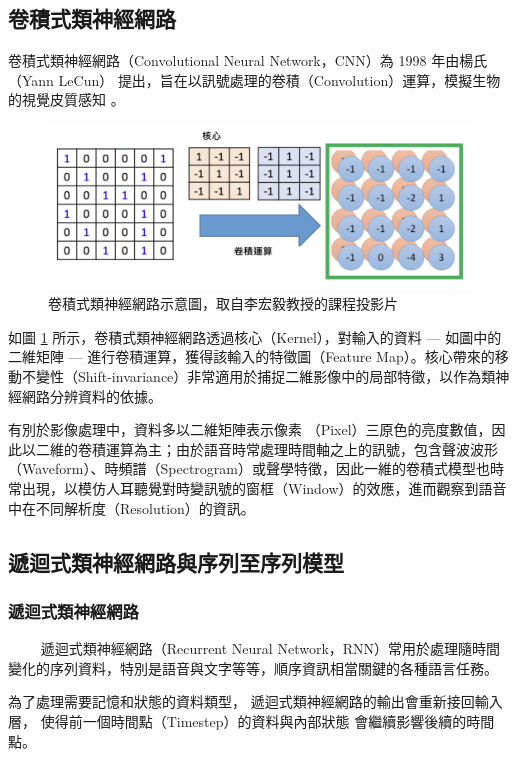 \subsection{卷積式類神經網路}

卷積式類神經網路（Convolutional Neural Network，CNN）為 1998 年由楊氏（Yann LeCun） \cite{lecun_gradient-based_1998} 提出，旨在以訊號處理的卷積（Convolution）運算，模擬生物的視覺皮質感知 \cite{hubel_receptive_1959} 。

\begin{figure}
    \centering
    \includegraphics[width=0.9\linewidth]{figures/cnnnew.png}
    \caption{卷積式類神經網路示意圖，取自李宏毅教授的課程投影片}
    \label{fig:cnn}
\end{figure}

如圖 \ref{fig:cnn} 所示，卷積式類神經網路透過核心（Kernel），對輸入的資料 --- 如圖中的二維矩陣 --- 進行卷積運算，獲得該輸入的特徵圖（Feature Map）。核心帶來的移動不變性（Shift-invariance）非常適用於捕捉二維影像中的局部特徵，以作為類神經網路分辨資料的依據。

有別於影像處理中，資料多以二維矩陣表示像素 （Pixel）三原色的亮度數值，因此以二維的卷積運算為主；由於語音時常處理時間軸之上的訊號，包含聲波波形（Waveform）、時頻譜（Spectrogram）或聲學特徵，因此一維的卷積式模型也時常出現，以模仿人耳聽覺對時變訊號的窗框（Window）的效應，進而觀察到語音中在不同解析度（Resolution）的資訊。

\subsection{遞迴式類神經網路與序列至序列模型}

\subsubsection{遞迴式類神經網路}
　　
遞迴式類神經網路（Recurrent Neural Network，RNN）常用於處理隨時間變化的序列資料，特別是語音與文字等等，順序資訊相當關鍵的各種語言任務。

為了處理需要記憶和狀態的資料類型，
遞迴式類神經網路的輸出會重新接回輸入層，
使得前一個時間點（Timestep）的資料與內部狀態
會繼續影響後續的時間點。

